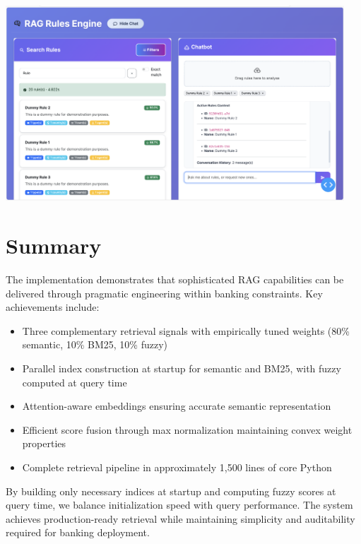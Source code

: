\vspace{0.5em}
\noindent
\begin{minipage}{\textwidth}
\centering
\includegraphics[width=0.95\textwidth]{Figures/search_chat_example.png}
\label{fig:search-chat}
\end{minipage}
\vspace{0.5em}

\section{Summary}

The implementation demonstrates that sophisticated RAG capabilities can be delivered through pragmatic engineering within banking constraints. Key achievements include:

\begin{itemize}[leftmargin=*,itemsep=2pt,topsep=2pt]
  \item Three complementary retrieval signals with empirically tuned weights (80\% semantic, 10\% BM25, 10\% fuzzy)
  \item Parallel index construction at startup for semantic and BM25, with fuzzy computed at query time
  \item Attention-aware embeddings ensuring accurate semantic representation
  \item Efficient score fusion through max normalization maintaining convex weight properties
  \item Complete retrieval pipeline in approximately 1,500 lines of core Python
\end{itemize}

By building only necessary indices at startup and computing fuzzy scores at query time, we balance initialization speed with query performance. The system achieves production-ready retrieval while maintaining simplicity and auditability required for banking deployment.
